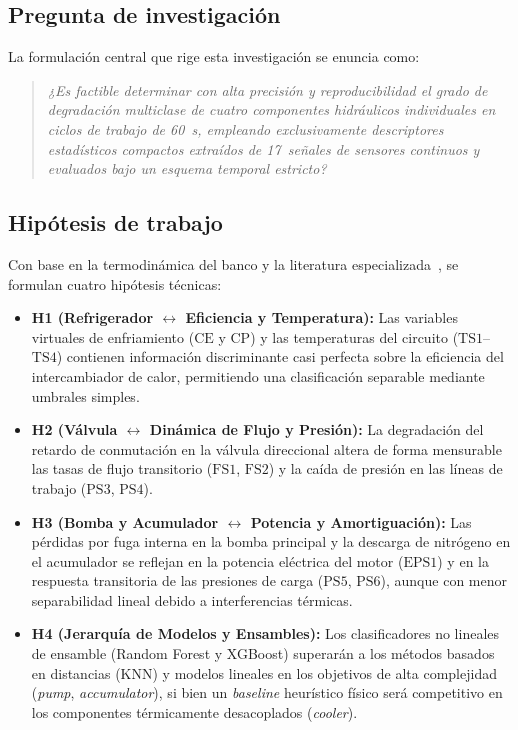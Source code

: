 \documentclass[journal]{IEEEtran}
\begin{document}
\subsection{Pregunta de investigación}

La formulación central que rige esta investigación se enuncia como:

\begin{quote}
\emph{¿Es factible determinar con alta precisión y reproducibilidad el grado de degradación multiclase de cuatro componentes hidráulicos individuales en ciclos de trabajo de \SI{60}{\second}, empleando exclusivamente descriptores estadísticos compactos extraídos de 17~señales de sensores continuos y evaluados bajo un esquema temporal estricto?}
\end{quote}

\subsection{Hipótesis de trabajo}

Con base en la termodinámica del banco y la literatura especializada~\cite{Helwig2015, Schneider2017}, se formulan cuatro hipótesis técnicas:

\begin{itemize}[leftmargin=*]
    \item \textbf{H1 (Refrigerador $\leftrightarrow$ Eficiencia y Temperatura):} Las variables virtuales de enfriamiento ($\text{CE}$ y $\text{CP}$) y las temperaturas del circuito ($\text{TS1}$--$\text{TS4}$) contienen información discriminante casi perfecta sobre la eficiencia del intercambiador de calor, permitiendo una clasificación separable mediante umbrales simples.
    \item \textbf{H2 (Válvula $\leftrightarrow$ Dinámica de Flujo y Presión):} La degradación del retardo de conmutación en la válvula direccional altera de forma mensurable las tasas de flujo transitorio ($\text{FS1}$, $\text{FS2}$) y la caída de presión en las líneas de trabajo ($\text{PS3}$, $\text{PS4}$).
    \item \textbf{H3 (Bomba y Acumulador $\leftrightarrow$ Potencia y Amortiguación):} Las pérdidas por fuga interna en la bomba principal y la descarga de nitrógeno en el acumulador se reflejan en la potencia eléctrica del motor ($\text{EPS1}$) y en la respuesta transitoria de las presiones de carga ($\text{PS5}$, $\text{PS6}$), aunque con menor separabilidad lineal debido a interferencias térmicas.
    \item \textbf{H4 (Jerarquía de Modelos y Ensambles):} Los clasificadores no lineales de ensamble (Random Forest y XGBoost) superarán a los métodos basados en distancias (KNN) y modelos lineales en los objetivos de alta complejidad (\emph{pump}, \emph{accumulator}), si bien un \emph{baseline} heurístico físico será competitivo en los componentes térmicamente desacoplados (\emph{cooler}).
\end{itemize}
\end{document}
